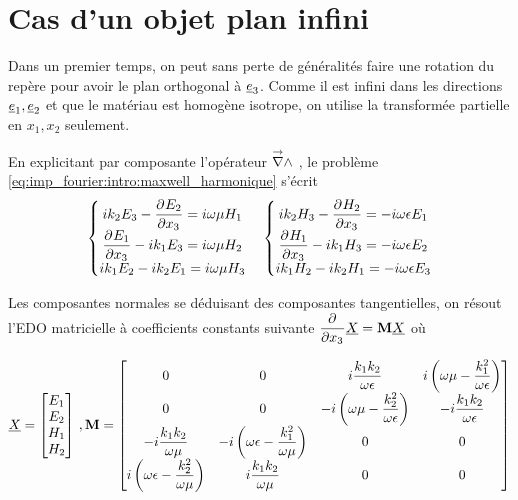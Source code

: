 \section{Cas d'un objet plan infini}



Dans un premier temps, on peut sans perte de généralités faire une rotation du repère pour avoir le plan orthogonal à $\v e_3$. Comme il est infini dans les directions $\v e_1, \v e_2$ et que le matériau est homogène isotrope, on utilise la transformée partielle en $x_1, x_2$ seulement.

En explicitant par composante l'opérateur $\vrot$ , le problème \eqref{eq:imp_fourier:intro:maxwell_harmonique} s'écrit  
\begin{align*}
    \left\lbrace 
    \begin{matrix}
    ik_2 E_3  - \ddr{x_3}{E_ 2} = i \w \mu H_1 \\
    \ddr{x_3}{E_1} - ik_1 E_3 = i\w \mu H_2 \\
    ik_1 E_2 - ik_2 E_1 = i\w \mu H_3 \\
    \end{matrix}
    \right. \quad 
    \left\lbrace 
    \begin{matrix}
    ik_2 H_3  - \ddr{x_3}{H_ 2} = -i \w \eps E_1 \\
    \ddr{x_3}{H_1} - ik_1 H_3 = -i\w \eps E_2 \\
    ik_1 H_2 - ik_2 H_1 = -i\w \eps E_3 \\
    \end{matrix}
    \right.
\end{align*}

Les composantes normales se déduisant des composantes tangentielles, on résout l'EDO matricielle à coefficients constants 
suivante $\ddr{x_3}{}\v{X} = \mat{M} \v{X}$ où

\begin{equation}
    \v{X} = 
    \begin{bmatrix}
    E_1 \\ 
    E_2 \\ 
    H_1 \\ 
    H_2 \\
    \end{bmatrix}\,,
    \mat{M} = \begin{bmatrix}
    0 & 0 & i\frac{k_1k_2}{\w\eps} & i\left(\w\mu - \frac{k_1^2}{\w\eps}\right)\\
    0 & 0 & -i\left(\w\mu - \frac{k_2^2}{\w\eps}\right) & -i\frac{k_1k_2}{\w\eps}\\
    -i\frac{k_1k_2}{\w\mu} & -i\left(\w\eps - \frac{k_1^2}{\w\mu}\right) & 0 & 0 \\
    i\left(\w\eps - \frac{k_2^2}{\w\mu}\right) & i\frac{k_1k_2}{\w\mu} & 0 & 0 \\
    \end{bmatrix}
\end{equation}

